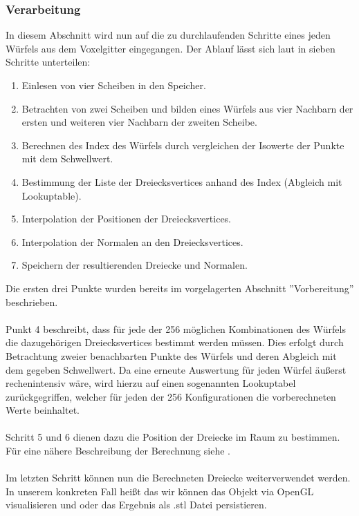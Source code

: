 \subsubsection{Verarbeitung}
In diesem Abschnitt wird nun auf die zu durchlaufenden Schritte eines jeden Würfels aus dem Voxelgitter eingegangen. Der Ablauf lässt sich laut \citep{MCAlgo} in sieben Schritte unterteilen:
\begin{enumerate}
	\item Einlesen von vier Scheiben in den Speicher.
	\item Betrachten von zwei Scheiben und bilden eines Würfels aus vier Nachbarn der ersten und weiteren vier Nachbarn der zweiten Scheibe.
	\item Berechnen des Index des Würfels durch vergleichen der Isowerte der Punkte mit dem Schwellwert.
	\item Bestimmung der Liste der Dreiecksvertices anhand des Index (Abgleich mit Lookuptable).
	\item Interpolation der Positionen der Dreiecksvertices.
	\item Interpolation der Normalen an den Dreiecksvertices.
	\item Speichern der resultierenden Dreiecke und Normalen.\\
\end{enumerate}

\noindent Die ersten drei Punkte wurden bereits im vorgelagerten Abschnitt ''Vorbereitung'' beschrieben. \\
\\
Punkt 4 beschreibt, dass für jede der 256 möglichen Kombinationen des Würfels die dazugehörigen Dreiecksvertices bestimmt werden müssen. Dies erfolgt durch Betrachtung zweier benachbarten Punkte des Würfels und deren Abgleich mit dem gegeben Schwellwert. Da eine erneute Auswertung für jeden Würfel äußerst rechenintensiv wäre, wird hierzu auf einen sogenannten Lookuptabel zurückgegriffen, welcher für jeden der 256 Konfigurationen die vorberechneten Werte beinhaltet. \\
\\
Schritt 5 und 6 dienen dazu die Position der Dreiecke im Raum zu bestimmen. Für eine nähere Beschreibung der Berechnung siehe \citep{MCAlgo}.\\
\\
Im letzten Schritt können nun die Berechneten Dreiecke weiterverwendet werden. In unserem konkreten Fall heißt das wir können das Objekt via OpenGL visualisieren und oder das Ergebnis als .stl Datei persistieren.

